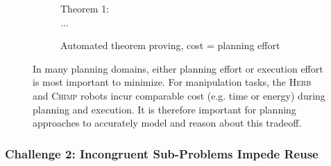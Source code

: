 {\begin{figure}[t]
\begin{widepage}
\begin{center}
\begin{subfigure}[b]{1.8in}
{\begin{minipage}[t]{\textwidth - 2\fboxsep}
            Theorem 1: \\
            $\dots$
         \end{minipage}
      }
      \caption{Automated theorem proving,
         cost = planning effort}
   \end{subfigure}
   \caption{In many planning domains,
      either planning effort or execution effort is most important
      to minimize.
      For manipulation tasks,
      the \textsc{Herb} \cite{srinivasa2012herb20}
      and \textsc{Chimp} \cite{stentz2014chimp} robots
      incur comparable cost (e.g. time or energy)
      during planning and execution.
      It is therefore important for planning approaches
      to accurately model and reason about this tradeoff.
      }
   \label{fig:plan-exec-cost}
\end{center}
\end{widepage}
\end{figure}
}


\subsubsection*{Challenge 2: Incongruent Sub-Problems Impede Reuse}

